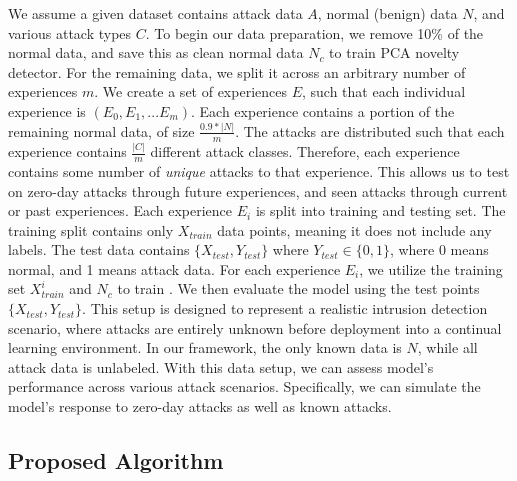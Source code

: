 We assume a given dataset contains attack data $A$, normal (benign) data $N$, and various attack types $C$. 
To begin our data preparation, we remove 10\% of the normal data, and save this as clean normal data $N_c$ to train PCA novelty detector. For the remaining data, we split it across an arbitrary number of experiences $m$. We create a set of experiences $E$, such that each individual experience is $(E_0, E_1,...E_{m})$. Each experience contains a portion of the remaining normal data, of size $\frac{0.9 *|N|}{m}$. The attacks are distributed such that each experience contains $\frac{|C|}{m}$ different attack classes. Therefore, each experience contains some number of \textit{unique} attacks to that experience. This allows us to test on zero-day attacks through future experiences, and seen attacks through current or past experiences. Each experience $E_i$ is split into training and testing set. The training split contains only $X_{train}$ data points, meaning it does not include any labels. The test data contains $\{X_{test},Y_{test}\}$ where $Y_{test} \in \{0,1\}$, where 0 means normal, and 1 means attack data. For each experience $E_i$, we utilize the training set $X_{train}^i$ and $N_c$ to train \Design{}. We then evaluate the model using the test points $\{X_{test},Y_{test}\}$. This setup is designed to represent a realistic intrusion detection scenario, where attacks are entirely unknown before deployment into a continual learning environment. In our framework, the only known data is $N$, while all attack data is unlabeled. With this data setup, we can assess model's performance across various attack scenarios. Specifically, we can simulate the model's response to zero-day attacks as well as known attacks.

\subsection{Proposed Algorithm}

